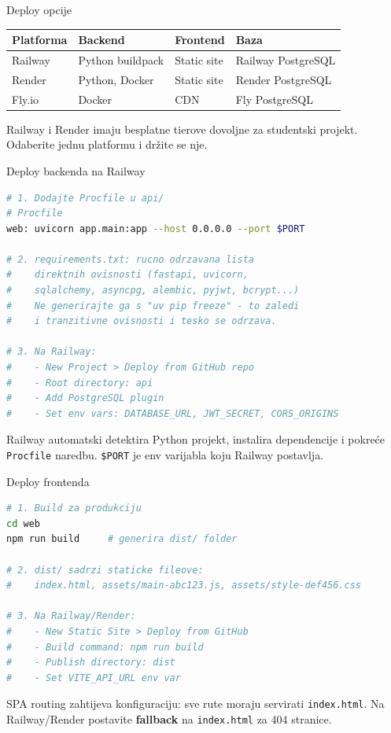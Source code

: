 \begin{frame}{Deploy opcije}
\begin{tabular}{@{}llll@{}}
  \toprule
  \textbf{Platforma} & \textbf{Backend} & \textbf{Frontend} & \textbf{Baza} \\
  \midrule
  Railway & Python buildpack & Static site & Railway PostgreSQL \\
  Render & Python, Docker & Static site & Render PostgreSQL \\
  Fly.io & Docker & CDN & Fly PostgreSQL \\
  \bottomrule
\end{tabular}

\vspace{0.6em}
Railway i Render imaju besplatne tierove dovoljne za studentski projekt. Odaberite jednu platformu i držite se nje.
\end{frame}

\begin{frame}[fragile,shrink=5]{Deploy backenda na Railway}
\begin{lstlisting}[language=bash]
# 1. Dodajte Procfile u api/
# Procfile
web: uvicorn app.main:app --host 0.0.0.0 --port $PORT

# 2. requirements.txt: rucno odrzavana lista
#    direktnih ovisnosti (fastapi, uvicorn,
#    sqlalchemy, asyncpg, alembic, pyjwt, bcrypt...)
#    Ne generirajte ga s "uv pip freeze" - to zaledi
#    i tranzitivne ovisnosti i tesko se odrzava.

# 3. Na Railway:
#    - New Project > Deploy from GitHub repo
#    - Root directory: api
#    - Add PostgreSQL plugin
#    - Set env vars: DATABASE_URL, JWT_SECRET, CORS_ORIGINS
\end{lstlisting}

\vspace{0.4em}
Railway automatski detektira Python projekt, instalira dependencije i pokreće \texttt{Procfile} naredbu. \texttt{\$PORT} je env varijabla koju Railway postavlja.
\end{frame}

\begin{frame}[fragile,shrink=5]{Deploy frontenda}
\begin{lstlisting}[language=bash]
# 1. Build za produkciju
cd web
npm run build     # generira dist/ folder

# 2. dist/ sadrzi staticke fileove:
#    index.html, assets/main-abc123.js, assets/style-def456.css

# 3. Na Railway/Render:
#    - New Static Site > Deploy from GitHub
#    - Build command: npm run build
#    - Publish directory: dist
#    - Set VITE_API_URL env var
\end{lstlisting}

\vspace{0.4em}
SPA routing zahtijeva konfiguraciju: sve rute moraju servirati \texttt{index.html}. Na Railway/Render postavite \textbf{fallback} na \texttt{index.html} za 404 stranice.
\end{frame}

